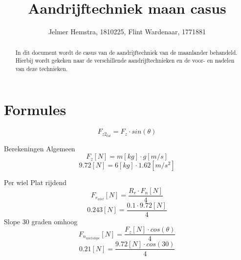 \documentclass{article}
\title{Aandrijftechniek maan casus}
\author{Jelmer Hemstra, 1810225, Flint Wardenaar, 1771881}
\begin{document}
    \maketitle

    \begin{abstract}
        In dit document wordt de casus van de aandrijftechniek van de maanlander behandeld. Hierbij wordt gekeken naar de verschillende aandrijftechnieken en de voor- en nadelen van deze technieken.

    \end{abstract}


\section{Formules}
    $$
        F_{z2_{tot}} = F_z \cdot sin(\theta)
    $$

    Berekeningen
    Algemeen
    $$
        F_z [N] = m[kg] \cdot g[m/s]
    $$$$
        9.72 [N] = 6 [kg] \cdot 1.62[m/s^2]
    $$
 
    Per wiel
    Plat rijdend
    $$
        F_{r_{wiel}}[N]= \frac {R_r \cdot F_n[N]}{4}
    $$
    $$
        0.243 [N]=  \frac {0.1 \cdot 9.72[N]}{4}
    $$
    Slope 30 graden omhoog
    $$
        F_{n_{wielslope}} [N] = \frac {F_z [N] \cdot cos(\theta)}{4}
    $$
    $$
        0.21 [N] = \frac {9.72[N] \cdot cos(30)}{4}
    $$
\end{document}
